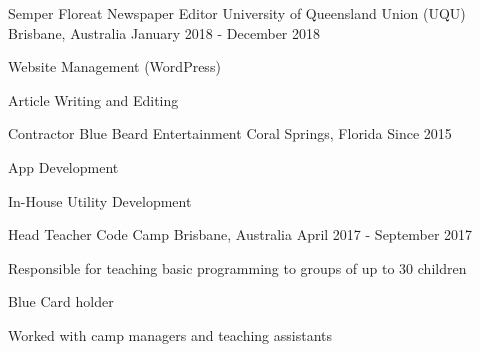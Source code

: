 


\begin{cventries}


\cventry
{Semper Floreat Newspaper Editor} %
{University of Queensland Union (UQU)} %
{Brisbane, Australia} %
{January 2018 - December 2018} %
{ %
\begin{cvitems}
\item {Website Management (WordPress)}
\item {Article Writing and Editing}
\end{cvitems}
}


\cventry
{Contractor} %
{Blue Beard Entertainment} %
{Coral Springs, Florida} %
{Since 2015} %
{ %
\begin{cvitems}
\item {App Development}
\item {In-House Utility Development}
\end{cvitems}
}


\cventry
{Head Teacher} %
{Code Camp} %
{Brisbane, Australia} %
{April 2017 - September 2017} %
{ %
\begin{cvitems}
\item {Responsible for teaching basic programming to groups of up to 30 children}
\item {Blue Card holder}
\item {Worked with camp managers and teaching assistants}
\end{cvitems}
}


\end{cventries}